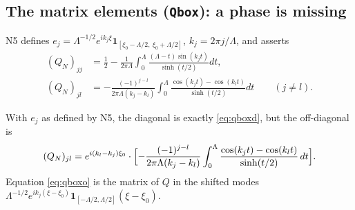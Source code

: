 \documentclass[11pt]{article}
\newcommand{\one}{\mathbf 1}
\begin{document}
\subsection{The matrix elements (\texttt{Qbox}): a phase is missing}\label{sec:qboxphase}

N5 defines
$e_j=\Lambda^{-1/2}e^{ik_j\xi}\one_{[\xi_0-\Lambda/2,\ \xi_0+\Lambda/2]}$, $k_j=2\pi j/\Lambda$,
and asserts
\begin{align}
 (Q_N)_{jj}&=\tfrac12-\tfrac1{2\pi\Lambda}\int_0^\Lambda\tfrac{(\Lambda-t)\sin(k_jt)}{\sinh(t/2)}dt,
 \label{eq:qboxd}\\
 (Q_N)_{jl}&=-\tfrac{(-1)^{j-l}}{2\pi\Lambda(k_j-k_l)}\int_0^\Lambda\tfrac{\cos(k_jt)-\cos(k_lt)}{\sinh(t/2)}dt
 \qquad(j\ne l).\label{eq:qboxo}
\end{align}

\begin{proposition}\label{prop:qbox}
With $e_j$ as defined by N5, the diagonal is exactly \eqref{eq:qboxd}, but the off-diagonal is
\[
 (Q_N)_{jl}=e^{i(k_l-k_j)\xi_0}\cdot\Bigl[-\frac{(-1)^{j-l}}{2\pi\Lambda(k_j-k_l)}
 \int_0^\Lambda\frac{\cos(k_jt)-\cos(k_lt)}{\sinh(t/2)}\,dt\Bigr].
\]
Equation \eqref{eq:qboxo} is the matrix of $Q$ in the shifted modes
$\Lambda^{-1/2}e^{ik_j(\xi-\xi_0)}\one_{[-\Lambda/2,\Lambda/2]}(\xi-\xi_0)$.
\end{proposition}
\end{document}
